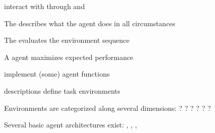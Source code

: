\documentclass{article}
\begin{document}
\begin{huge}
\textwidth
{}



\textwidth
{}


\textwidth
{}



 interact with  through
 and 

The  describes what the agent does in all circumstances

The  evaluates the environment sequence

A  agent maximizes expected performance 

 implement (some) agent functions

 descriptions define task environments

Environments are categorized along several dimensions:\nl
  ? ? ? ? 
  ? ?

Several basic agent architectures exist:\nl
  , , , 

\end{huge}
\end{document}

